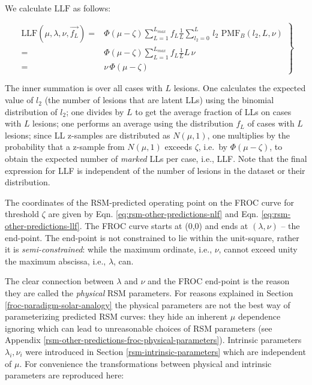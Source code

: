 \documentclass[
]{book}
\begin{document}
We calculate \(\text{LLF}\) as follows:

\begin{equation} 
\left. 
\begin{aligned}
\text{LLF} \left ( \mu, \lambda, \nu, \overrightarrow{f_L} \right ) 
=& \Phi\left ( \mu - \zeta \right )\sum_{L=1}^{L_{max}} f_L \frac{1}{L} \sum_{l_2=0}^{L}  \, l_2 \,\,  \text{PMF}_{B}\left ( l_2, L, \nu \right )\\
=&\Phi\left ( \mu - \zeta \right )\sum_{L=1}^{L_{max}} f_L \frac{1}{L} L \,\nu\\
=&\nu \,\Phi\left ( \mu - \zeta \right )
\end{aligned}
\right \}
\label{eq:rsm-other-predictions-llf}
\end{equation}

The inner summation is over all cases with \(L\) lesions. One calculates the expected value of \(l_2\) (the number of lesions that are latent LLs) using the binomial distribution of \(l_2\); one divides by \(L\) to get the average fraction of LLs on cases with \(L\) lesions; one performs an average using the distribution \(f_L\) of cases with \(L\) lesions; since LL z-samples are distributed as \(N(\mu,1)\), one multiplies by the probability that a z-sample from \(N(\mu,1)\) exceeds \(\zeta\), i.e.~by \(\Phi(\mu-\zeta)\), to obtain the expected number of \emph{marked} LLs per case, i.e., LLF. Note that the final expression for LLF is independent of the number of lesions in the dataset or their distribution.

The coordinates of the RSM-predicted operating point on the FROC curve for threshold \(\zeta\) are given by Eqn. \eqref{eq:rsm-other-predictions-nlf} and Eqn. \eqref{eq:rsm-other-predictions-llf}. The FROC curve starts at (0,0) and ends at \(\left ( \lambda, \nu \right )\) -- the end-point. The end-point is not constrained to lie within the unit-square, rather it is \emph{semi-constrained}: while the maximum ordinate, i.e., \(\nu\), cannot exceed unity the maximum abscissa, i.e., \(\lambda\), can.

The clear connection between \(\lambda\) and \(\nu\) and the FROC end-point is the reason they are called the \emph{physical} RSM parameters. For reasons explained in Section \ref{froc-paradigm-solar-analogy} the physical parameters are not the best way of parameterizing predicted RSM curves: they hide an inherent \(\mu\) dependence ignoring which can lead to unreasonable choices of RSM parameters (see Appendix \ref{rsm-other-predictions-froc-physical-parameters}). Intrinsic parameters \(\lambda_i, \nu_i\) were introduced in Section \ref{rsm-intrinsic-parameters} which are independent of \(\mu\). For convenience the transformations between physical and intrinsic parameters are reproduced here:
\end{document}
